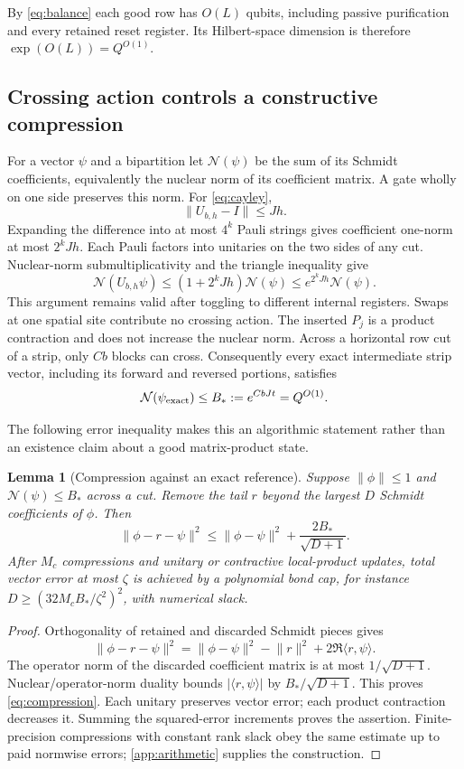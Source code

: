 \documentclass[11pt,reqno]{amsart}
\numberwithin{equation}{section}
\newtheorem{lemma}[theorem]{Lemma}
\theoremstyle{definition}
\theoremstyle{remark}
\newcommand{\nn}[1]{\lVert#1\rVert}
\newcommand{\ip}[2]{\langle#1,#2\rangle}
\newcommand{\cN}{\mathcal N}
\begin{document}
By \eqref{eq:balance} each good row has $O(L)$ qubits, including passive purification and every retained reset register. Its Hilbert-space dimension is therefore $\exp(O(L))=Q^{O(1)}$.

\subsection{Crossing action controls a constructive compression}
For a vector $\psi$ and a bipartition let $\cN(\psi)$ be the sum of its Schmidt coefficients, equivalently the nuclear norm of its coefficient matrix. A gate wholly on one side preserves this norm. For \eqref{eq:cayley},
\[
 \nn{U_{b,h}-I}\leq Jh.
\]
Expanding the difference into at most $4^k$ Pauli strings gives coefficient one-norm at most $2^kJh$. Each Pauli factors into unitaries on the two sides of any cut. Nuclear-norm submultiplicativity and the triangle inequality give
\begin{equation}\label{eq:nuclear}
 \cN(U_{b,h}\psi)\leq(1+2^kJh)\cN(\psi)
 \leq e^{2^kJh}\cN(\psi).
\end{equation}
This argument remains valid after toggling to different internal registers. Swaps at one spatial site contribute no crossing action. The inserted $P_j$ is a product contraction and does not increase the nuclear norm. Across a horizontal row cut of a strip, only $Cb$ blocks can cross. Consequently every exact intermediate strip vector, including its forward and reversed portions, satisfies
\begin{equation}\label{eq:Bstar}
 \cN(\psi_{\rm exact})\leq B_*:=e^{CbJt}=Q^{O(1)}.
\end{equation}

The following error inequality makes this an algorithmic statement rather than an existence claim about a good matrix-product state.

\begin{lemma}[Compression against an exact reference]\label{lem:compression}
Suppose $\nn\phi\leq1$ and $\cN(\psi)\leq B_*$ across a cut. Remove the tail $r$ beyond the largest $D$ Schmidt coefficients of $\phi$. Then
\begin{equation}\label{eq:compression}
 \nn{\phi-r-\psi}^2\leq\nn{\phi-\psi}^2+\frac{2B_*}{\sqrt{D+1}}.
\end{equation}
After $M_c$ compressions and unitary or contractive local-product updates, total vector error at most $\zeta$ is achieved by a polynomial bond cap, for instance
$D\geq(32M_cB_*/\zeta^2)^2$, with numerical slack.
\end{lemma}
\begin{proof}
Orthogonality of retained and discarded Schmidt pieces gives
\[
 \nn{\phi-r-\psi}^2=\nn{\phi-\psi}^2-\nn r^2+2\Re\ip r\psi.
\]
The operator norm of the discarded coefficient matrix is at most $1/\sqrt{D+1}$. Nuclear/operator-norm duality bounds $|\ip r\psi|$ by $B_*/\sqrt{D+1}$. This proves \eqref{eq:compression}. Each unitary preserves vector error; each product contraction decreases it. Summing the squared-error increments proves the assertion. Finite-precision compressions with constant rank slack obey the same estimate up to paid normwise errors; \cref{app:arithmetic} supplies the construction.
\end{proof}
\end{document}
